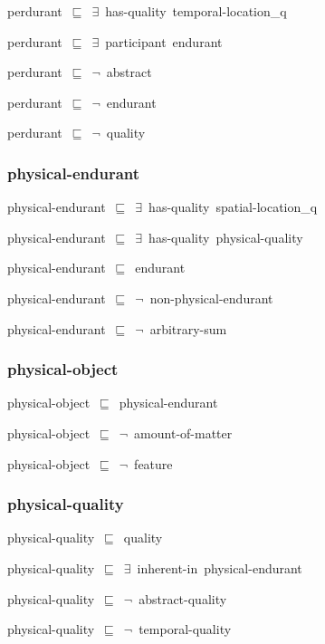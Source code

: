 \documentclass{article}
\begin{document}
perdurant~\ensuremath{\sqsubseteq}~\ensuremath{\exists}~has-quality~temporal-location\_q~

perdurant~\ensuremath{\sqsubseteq}~\ensuremath{\exists}~participant~endurant~

perdurant~\ensuremath{\sqsubseteq}~\ensuremath{\lnot}~abstract

perdurant~\ensuremath{\sqsubseteq}~\ensuremath{\lnot}~endurant

perdurant~\ensuremath{\sqsubseteq}~\ensuremath{\lnot}~quality

\subsubsection*{physical-endurant}

physical-endurant~\ensuremath{\sqsubseteq}~\ensuremath{\exists}~has-quality~spatial-location\_q~

physical-endurant~\ensuremath{\sqsubseteq}~\ensuremath{\exists}~has-quality~physical-quality~

physical-endurant~\ensuremath{\sqsubseteq}~endurant~

physical-endurant~\ensuremath{\sqsubseteq}~\ensuremath{\lnot}~non-physical-endurant

physical-endurant~\ensuremath{\sqsubseteq}~\ensuremath{\lnot}~arbitrary-sum

\subsubsection*{physical-object}

physical-object~\ensuremath{\sqsubseteq}~physical-endurant~

physical-object~\ensuremath{\sqsubseteq}~\ensuremath{\lnot}~amount-of-matter

physical-object~\ensuremath{\sqsubseteq}~\ensuremath{\lnot}~feature

\subsubsection*{physical-quality}

physical-quality~\ensuremath{\sqsubseteq}~quality~

physical-quality~\ensuremath{\sqsubseteq}~\ensuremath{\exists}~inherent-in~physical-endurant~

physical-quality~\ensuremath{\sqsubseteq}~\ensuremath{\lnot}~abstract-quality

physical-quality~\ensuremath{\sqsubseteq}~\ensuremath{\lnot}~temporal-quality
\end{document}
